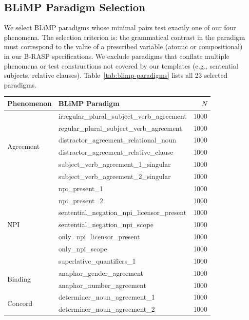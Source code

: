 \documentclass[11pt]{article}
\begin{document}
\subsection{BLiMP Paradigm Selection}
\label{app:blimp}

We select BLiMP paradigms \citep{warstadt2020blimp} whose minimal pairs test exactly one of our four phenomena.
The selection criterion is: the grammatical contrast in the paradigm must correspond to the value of a prescribed variable (atomic or compositional) in our B-RASP specifications.
We exclude paradigms that conflate multiple phenomena or test constructions not covered by our templates (e.g., sentential subjects, relative clauses).
Table~\ref{tab:blimp-paradigms} lists all 23 selected paradigms.

\begin{table}[t]
\centering\footnotesize
\setlength{\tabcolsep}{4pt}
\begin{tabular}{@{}llr@{}}
\toprule
\textbf{Phenomenon} & \textbf{BLiMP Paradigm} & \textbf{$N$} \\
\midrule
\multirow{6}{*}{Agreement}
 & irregular\_plural\_subject\_verb\_agreement & 1000 \\
 & regular\_plural\_subject\_verb\_agreement & 1000 \\
 & distractor\_agreement\_relational\_noun & 1000 \\
 & distractor\_agreement\_relative\_clause & 1000 \\
 & subject\_verb\_agreement\_1\_singular & 1000 \\
 & subject\_verb\_agreement\_2\_singular & 1000 \\
\midrule
\multirow{7}{*}{NPI}
 & npi\_present\_1 & 1000 \\
 & npi\_present\_2 & 1000 \\
 & sentential\_negation\_npi\_licensor\_present & 1000 \\
 & sentential\_negation\_npi\_scope & 1000 \\
 & only\_npi\_licensor\_present & 1000 \\
 & only\_npi\_scope & 1000 \\
 & superlative\_quantifiers\_1 & 1000 \\
\midrule
\multirow{2}{*}{Binding}
 & anaphor\_gender\_agreement & 1000 \\
 & anaphor\_number\_agreement & 1000 \\
\midrule
\multirow{8}{*}{Concord}
 & determiner\_noun\_agreement\_1 & 1000 \\
 & determiner\_noun\_agreement\_2 & 1000 \\

\end{tabular}
\end{table}
\end{document}
